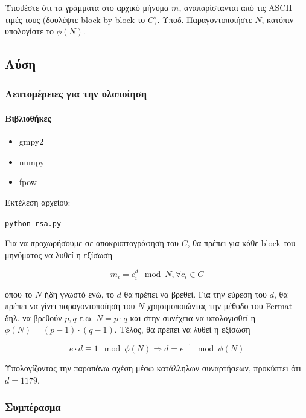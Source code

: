 \documentclass[oneside]{article}
\let\t\texttt
\begin{document}
Υποϑέστε ότι τα γράμματα στο αρχικό μήνυμα $m$, αναπαρίστανται από τις ASCII τιμές τους (δουλέψτε block by block το $C$).
Υποδ. Παραγοντοποιήστε $N$, κατόπιν υπολογίστε το $\phi(N)$.

\subsection{Λύση}

\subsubsection{Λεπτομέρειες για την υλοποίηση}

\paragraph{Βιβλιοθήκες}

\begin{itemize}
    \item gmpy2
    \item numpy
    \item fpow
\end{itemize}

Εκτέλεση αρχείου:

\begin{center}
    \t{python rsa.py}
\end{center}

Για να προχωρήσουμε σε αποκρυπτογράφηση του $C$, θα πρέπει για κάθε block του μηνύματος να λυθεί η εξίσωση

\begin{equation} \label{eq:121}
    m_i = c_i^d \mod{N}, \forall c_i \in C
\end{equation}

όπου το $N$ ήδη γνωστό ενώ, το $d$ θα πρέπει να βρεθεί.
Για την εύρεση του $d$, θα πρέπει να γίνει παραγοντοποίηση του $N$ χρησιμοποιώντας την μέθοδο του Fermat \cite{cryptoeprint:2023/026} δηλ. να βρεθούν $p, q$ ε.ω. $N = p \cdot q$ και στην συνέχεια να υπολογισθεί η $\phi(N) = (p - 1) \cdot (q - 1)$. Τέλος, θα πρέπει να λυθεί η εξίσωση

\begin{equation}
    e \cdot d \equiv 1 \mod{\phi(N)} \Rightarrow d = e^{-1} \mod{\phi(N)} 
\end{equation}

Υπολογίζοντας την παραπάνω σχέση μέσω κατάλληλων συναρτήσεων, προκύπτει ότι $d = 1179$.

\subsubsection{Συμπέρασμα}
\end{document}
